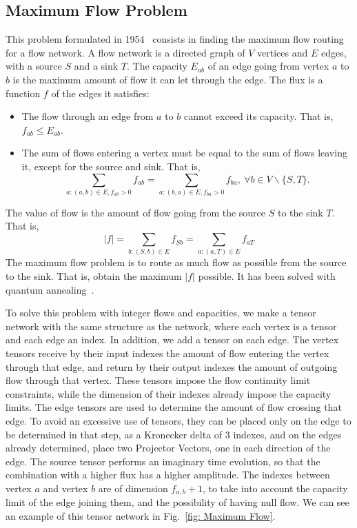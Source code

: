 \subsection{Maximum Flow Problem}
This problem formulated in 1954~\cite{Maximum_Flow} consists in finding the maximum flow routing for a flow network. A flow network is a directed graph of $V$ vertices and $E$ edges, with a source $S$ and a sink $T$. The capacity $E_{ab}$ of an edge going from vertex $a$ to $b$ is the maximum amount of flow it can let through the edge. The flux is a function $f$ of the edges it satisfies:
\begin{itemize}
    \item The flow through an edge from $a$ to $b$ cannot exceed its capacity. That is, $f_{ab}\leq E_{ab}$.
    \item The sum of flows entering a vertex must be equal to the sum of flows leaving it, except for the source and sink. That is, $$\sum_{a: (a,b)\in E, f_{ab}>0} f_{ab} = \sum_{a: (b,a)\in E, f_{ba}>0} f_{ba},\ \forall b\in V\backslash \{S,T\}.$$
\end{itemize}
The value of flow is the amount of flow going from the source $S$ to the sink $T$. That is,
\begin{equation}
    |f| = \sum_{b: (S,b)\in E} f_{Sb} = \sum_{a: (a,T)\in E} f_{aT}
\end{equation}
The maximum flow problem is to route as much flow as possible from the source to the sink. That is, obtain the maximum $|f|$ possible. It has been solved with quantum annealing~\cite{Max_Flow_Quantum}.

To solve this problem with integer flows and capacities, we make a tensor network with the same structure as the network, where each vertex is a tensor and each edge an index. In addition, we add a tensor on each edge. The vertex tensors receive by their input indexes the amount of flow entering the vertex through that edge, and return by their output indexes the amount of outgoing flow through that vertex. These tensors impose the flow continuity limit constraints, while the dimension of their indexes already impose the capacity limits. The edge tensors are used to determine the amount of flow crossing that edge. To avoid an excessive use of tensors, they can be placed only on the edge to be determined in that step, as a Kronecker delta of 3 indexes, and on the edges already determined, place two Projector Vectors, one in each direction of the edge. The source tensor performs an imaginary time evolution, so that the combination with a higher flux has a higher amplitude. The indexes between vertex $a$ and vertex $b$ are of dimension $f_{a,b}+1$, to take into account the capacity limit of the edge joining them, and the possibility of having null flow. We can see an example of this tensor network in Fig.~\ref{fig: Maximum Flow}.  

